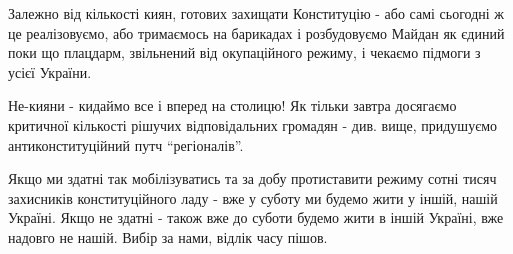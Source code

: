 Залежно від кількості киян, готових захищати Конституцію - або самі сьогодні ж
це реалізовуємо, або тримаємось на барикадах і розбудовуємо Майдан як єдиний
поки що плацдарм, звільнений від окупаційного режиму, і чекаємо підмоги з усієї
України.

Не-кияни - кидаймо все і вперед на столицю! Як тільки завтра досягаємо
критичної кількості рішучих відповідальних громадян - див. вище, придушуємо
антиконституційний путч \enquote{регіоналів}.

Якщо ми здатні так мобілізуватись та за добу протиставити режиму сотні тисяч
захисників конституційного ладу - вже у суботу ми будемо жити у іншій, нашій
Україні. Якщо не здатні - також вже до суботи будемо жити в іншій Україні, вже
надовго не нашій. Вибір за нами, відлік часу пішов.
